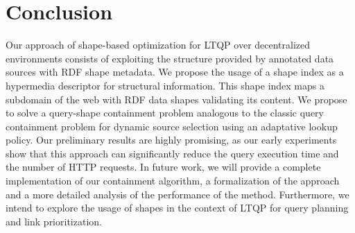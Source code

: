 \section{Conclusion}
Our approach of shape-based optimization for LTQP over decentralized environments consists of exploiting the structure provided by
annotated data sources with RDF shape metadata. 
We propose the usage of a shape index as a hypermedia descriptor for structural information.
This shape index maps a subdomain of the web with RDF data shapes validating its content.
We propose to solve a query-shape containment problem analogous to the classic query containment problem for dynamic source selection
using an adaptative lookup policy. 
Our preliminary results are highly promising,
as our early experiments show that this approach can significantly reduce the query execution time and the number of HTTP requests.
In future work, we will provide a complete implementation of our containment algorithm,
a formalization of the approach and a more detailed analysis of the performance of the method.
Furthermore, we intend to explore the usage of shapes in the context of LTQP for query planning and link prioritization.